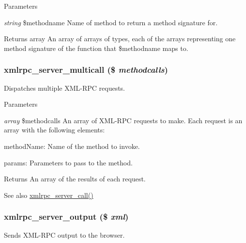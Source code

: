 \begin{DoxyParams}{Parameters}
\item[{\em string}]\$methodname Name of method to return a method signature for.\end{DoxyParams}
\begin{DoxyReturn}{Returns}
array An array of arrays of types, each of the arrays representing one method signature of the function that \$methodname maps to. 
\end{DoxyReturn}
\hypertarget{xmlrpcs_8inc_ae1cd0e09d695aef0363147fbd6091a76}{
\subsubsection[{xmlrpc\_\-server\_\-multicall}]{\setlength{\rightskip}{0pt plus 5cm}xmlrpc\_\-server\_\-multicall (\$ {\em methodcalls})}}
\label{xmlrpcs_8inc_ae1cd0e09d695aef0363147fbd6091a76}
Dispatches multiple XML-\/RPC requests.


\begin{DoxyParams}{Parameters}
\item[{\em array}]\$methodcalls An array of XML-\/RPC requests to make. Each request is an array with the following elements:
\begin{DoxyItemize}
\item methodName: Name of the method to invoke.
\item params: Parameters to pass to the method.
\end{DoxyItemize}\end{DoxyParams}
\begin{DoxyReturn}{Returns}
An array of the results of each request.
\end{DoxyReturn}
\begin{DoxySeeAlso}{See also}
\hyperlink{xmlrpcs_8inc_a892eae4961430f05ba83b9e1cf522485}{xmlrpc\_\-server\_\-call()} 
\end{DoxySeeAlso}
\hypertarget{xmlrpcs_8inc_ae06ded93094adefd59479489022b726a}{
\subsubsection[{xmlrpc\_\-server\_\-output}]{\setlength{\rightskip}{0pt plus 5cm}xmlrpc\_\-server\_\-output (\$ {\em xml})}}
\label{xmlrpcs_8inc_ae06ded93094adefd59479489022b726a}
Sends XML-\/RPC output to the browser.


